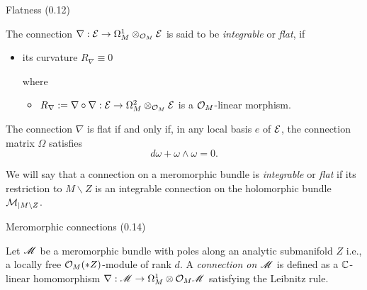 \begin{frame}[t]{Flatness (0.12)}
  \begin{defn}[0.12.2]
    The connection $\nabla:\mathcal{E}\to \Omega_M^1\otimes_{\mathcal{O}_M}\mathcal{E}$ is said to be
    \emph{integrable} or \emph{flat}, if
    \begin{itemize}
      \item its curvature $R_\nabla\equiv0$

      where
      \begin{itemize}
        \item $R_\nabla:=\nabla\circ\nabla:\mathcal{E}\to\Omega_M^2\otimes_{\mathcal{O}_M}\mathcal{E}$
          is a $\mathcal{O}_M$-linear morphism.
      \end{itemize}
    \end{itemize}
  \end{defn}
  \begin{prop}[0.12.4]
    The connection $\nabla$ is flat if and only if, in any local basis $e$ of
    $\mathcal{E}$, the connection matrix $\Omega$ satisfies
    \[
      d\omega + \omega \wedge \omega = 0.
    \]
  \end{prop}
  We will say that a connection on a meromorphic bundle is \emph{integrable}
  or \emph{flat} if its restriction to $M\backslash Z$ is an integrable connection on
  the holomorphic bundle $\mathcal{M}_{|M\backslash Z}$.
\end{frame}

\begin{frame}[t]{Meromorphic connections (0.14)}
  \begin{defn}
    Let $\mathscr{M}$ be a meromorphic bundle with poles along an analytic submanifold
    $Z$ i.e., a locally free $\mathcal{O}_M(*Z)$-module of rank $d$.
    A \emph{connection on $\mathscr{M}$} is defined as a $\mathbb{C}$-linear homomorphism
    $\nabla:\mathscr{M}\to\Omega_M^1\otimes{\ensuremath \mathcal{O}_M}\mathscr{M}$ satisfying the Leibnitz rule.
  \end{defn}
\end{frame}

